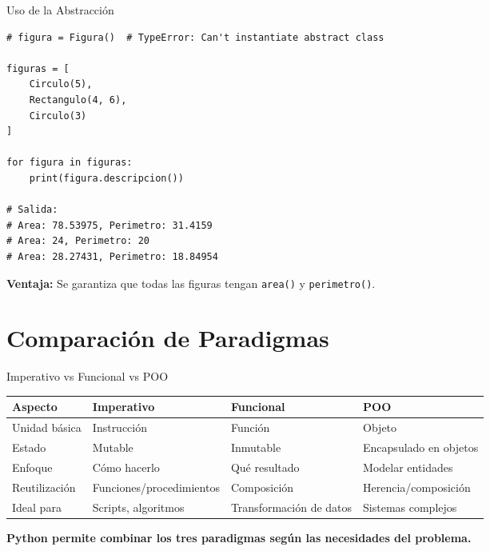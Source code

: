 \documentclass[aspectratio=169]{beamer}
\begin{document}
\begin{frame}[fragile]{Uso de la Abstracción}
    \begin{lstlisting}[title=Polimorfismo con Clases Abstractas]
# figura = Figura()  # TypeError: Can't instantiate abstract class

figuras = [
    Circulo(5),
    Rectangulo(4, 6),
    Circulo(3)
]

for figura in figuras:
    print(figura.descripcion())

# Salida:
# Area: 78.53975, Perimetro: 31.4159
# Area: 24, Perimetro: 20
# Area: 28.27431, Perimetro: 18.84954
    \end{lstlisting}
    
    \vspace{0.3cm}
    \textbf{Ventaja:} Se garantiza que todas las figuras tengan \texttt{area()} y \texttt{perimetro()}.
\end{frame}

\section{Comparación de Paradigmas}

\begin{frame}{Imperativo vs Funcional vs POO}
    \begin{table}[]
        \centering
        \renewcommand{\arraystretch}{1.3}
        \scriptsize
        \begin{tabular}{p{2.5cm} p{3.5cm} p{3.5cm} p{4cm}}
            \toprule
            \textbf{Aspecto} & \textbf{Imperativo} & \textbf{Funcional} & \textbf{POO} \\
            \midrule
            Unidad básica & Instrucción & Función & Objeto \\
            Estado & Mutable & Inmutable & Encapsulado en objetos \\
            Enfoque & Cómo hacerlo & Qué resultado & Modelar entidades \\
            Reutilización & Funciones/procedimientos & Composición & Herencia/composición \\
            Ideal para & Scripts, algoritmos & Transformación de datos & Sistemas complejos \\
            \bottomrule
        \end{tabular}
    \end{table}
    
    \vspace{0.5cm}
    \centering
    \textbf{Python permite combinar los tres paradigmas según las necesidades del problema.}
\end{frame}
\end{document}

